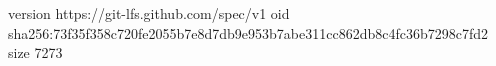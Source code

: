 version https://git-lfs.github.com/spec/v1
oid sha256:73f35f358c720fe2055b7e8d7db9e953b7abe311cc862db8c4fc36b7298c7fd2
size 7273
